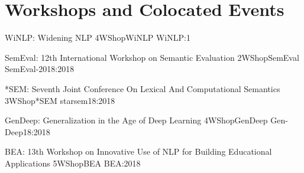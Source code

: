 \chapter[Workshops and Colocated Events: \daydate]{Workshops and Colocated Events}
\thispagestyle{emptyheader}





\begin{wsschedule}
  {WiNLP: Widening NLP}
  {4}{WShopWiNLP}
  {WiNLP:1}
  {\WShopLocD}
  
\end{wsschedule}


\begin{wsschedule}
  {SemEval: 12th International Workshop on Semantic Evaluation}
  {2}{WShopSemEval}
{SemEval-2018:2018}
  {\WShopLocC}
  
\end{wsschedule}

 \begin{wsschedule}
   {*SEM: Seventh Joint Conference On Lexical And Computational Semantics}
   {3}{WShop*SEM}
   {starsem18:2018}
   {\WShopLocB}
   
 \end{wsschedule}



\begin{wsschedule}
  {GenDeep: Generalization in the Age of Deep Learning}
  {4}{WShopGenDeep}
  {Gen-Deep18:2018}
  {\WShopLocE}
  
\end{wsschedule}

\begin{wsschedule}
  {BEA: 13th Workshop on Innovative Use of NLP for Building Educational Applications}
  {5}{WShopBEA}
  {BEA:2018}
  {\WShopLocF}
  
\end{wsschedule}

